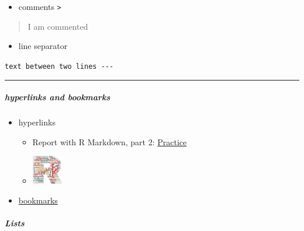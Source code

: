 \documentclass[
]{article}
\providecommand{\tightlist}{%
  \setlength{\itemsep}{0pt}\setlength{\parskip}{0pt}}
\begin{document}
\begin{itemize}
\tightlist
\item
  comments \texttt{\textgreater{}}
\end{itemize}

\begin{quote}
I am commented
\end{quote}

\begin{itemize}
\tightlist
\item
  line separator
\end{itemize}

\texttt{text\ between\ two\ lines\ -\/-\/-}

\begin{center}\rule{0.5\linewidth}{0.5pt}\end{center}

\hypertarget{hyperlinks-and-bookmarks}{%
\subparagraph{hyperlinks and bookmarks}\label{hyperlinks-and-bookmarks}}

\begin{itemize}
\tightlist
\item
  hyperlinks

  \begin{itemize}
  \item
    Report with R Markdown, part 2:
    \href{https://zoometh.github.io/oxford/R4A/2_R\%20Markdown_Practice}{Practice}
  \item
    \href{https://www.unipi.it/index.php/humanities/item/16574-r4rchaeologists}{\includegraphics[width=0.52083in,height=\textheight]{www/logo.png}}
  \end{itemize}
\item
  \protect\hyperlink{practice}{bookmarks}
\end{itemize}

\hypertarget{lists}{%
\subparagraph{Lists}\label{lists}}
\end{document}
